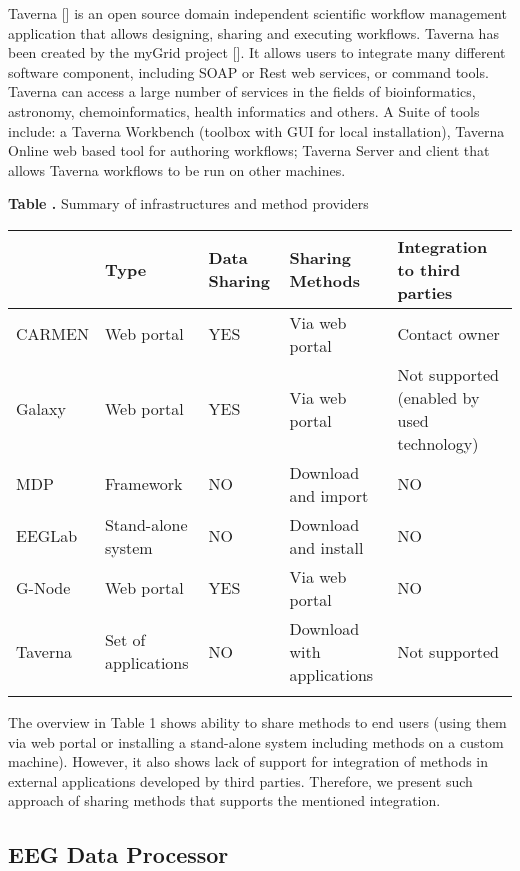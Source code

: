 \documentclass{frontiersSCNS} %
\begin{document}
Taverna [] is an open source domain independent scientific workflow management application that allows designing, sharing and executing workflows. Taverna has been created by the myGrid project []. It allows users to integrate many different software component, including SOAP or Rest web services, or command tools. Taverna can access a large number of services in the fields of bioinformatics, astronomy, chemoinformatics, health informatics and others. A Suite of tools include: a Taverna Workbench (toolbox with GUI for local installation), Taverna Online web based tool for authoring workflows; Taverna Server and client that allows Taverna workflows to be run on other machines.

\begin{table}[!t]
\textbf{\label{Tab:01} Table .}{ Summary of infrastructures and method providers }

\processtable{ }
{\begin{tabular}{lllll}\toprule
 & Type & Data Sharing & Sharing Methods & Integration to third parties \\\midrule

CARMEN & Web portal & YES & Via web portal & Contact owner\\\midrule
Galaxy &  Web portal & YES & Via web portal & Not supported (enabled by used technology)\\\midrule
MDP & Framework & NO & Download and import & NO\\\midrule
EEGLab & Stand-alone system & NO & Download and install & NO\\\midrule
G-Node & Web portal & YES & Via web portal & NO\\\midrule
Taverna & Set of applications & NO & Download with applications & Not supported\\\botrule
\end{tabular}}{}
\end{table}

The overview in Table 1 shows ability to share methods to end users (using them via web portal or installing a stand-alone system including methods on a custom machine). However, it also shows lack of support for integration of methods in external applications developed by third parties. Therefore, we present such approach of sharing methods that supports the mentioned integration.

\subsection{EEG Data Processor}
\end{document}

